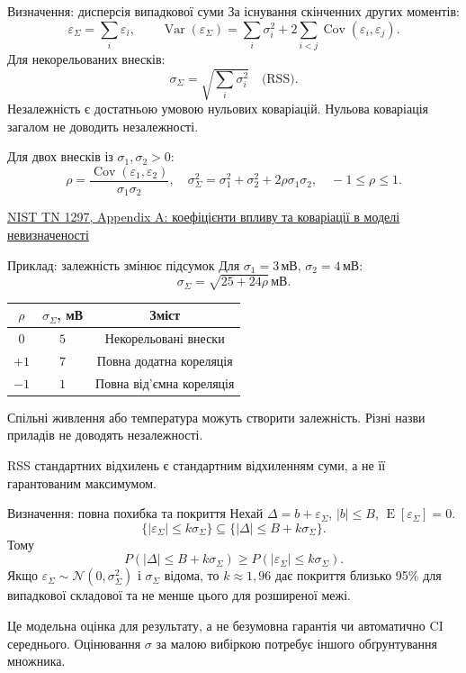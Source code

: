 \documentclass[aspectratio=169,11pt]{beamer}
\newcommand{\unit}[1]{\,\text{#1}}
\newcommand{\src}[2]{\par\vfill{\tiny\href{#1}{#2}}}
\newcommand{\E}{\operatorname{E}}
\newcommand{\Var}{\operatorname{Var}}
\newcommand{\Cov}{\operatorname{Cov}}
\begin{document}
\begin{frame}{Визначення: дисперсія випадкової суми}
За існування скінченних других моментів:
\[
\varepsilon_\Sigma=\sum_i\varepsilon_i,\qquad
\Var(\varepsilon_\Sigma)=\sum_i\sigma_i^2+2\sum_{i<j}\Cov(\varepsilon_i,\varepsilon_j).
\]
Для некорельованих внесків:
\[
\sigma_\Sigma=\sqrt{\sum_i\sigma_i^2}\quad\text{(RSS)}.
\]
Незалежність є достатньою умовою нульових коваріацій. Нульова коваріація загалом не доводить незалежності.
\medskip

Для двох внесків із $\sigma_1,\sigma_2>0$:
\[
\rho=\frac{\Cov(\varepsilon_1,\varepsilon_2)}{\sigma_1\sigma_2},\quad
\sigma_\Sigma^2=\sigma_1^2+\sigma_2^2+2\rho\sigma_1\sigma_2,\quad -1\le\rho\le1.
\]
\src{https://www.nist.gov/pml/nist-technical-note-1297/nist-tn-1297-appendix-law-propagation-uncertainty}{NIST TN 1297, Appendix A: коефіцієнти впливу та коваріації в моделі невизначеності}
\end{frame}

\begin{frame}{Приклад: залежність змінює підсумок}
Для $\sigma_1=3\unit{мВ}$, $\sigma_2=4\unit{мВ}$:
\[
\sigma_\Sigma=\sqrt{25+24\rho}\unit{мВ}.
\]
\begin{center}
\begin{tabular}{ccc}
\toprule
$\rho$ & $\sigma_\Sigma$, мВ & Зміст\\\midrule
$0$ & $5$ & Некорельовані внески\\
$+1$ & $7$ & Повна додатна кореляція\\
$-1$ & $1$ & Повна від’ємна кореляція\\\bottomrule
\end{tabular}
\end{center}
Спільні живлення або температура можуть створити залежність. Різні назви приладів не доводять незалежності.
\medskip

RSS стандартних відхилень є стандартним відхиленням суми, а не її гарантованим максимумом.
\end{frame}

\begin{frame}{Визначення: повна похибка та покриття}
Нехай $\Delta=b+\varepsilon_\Sigma$, $|b|\le B$, $\E[\varepsilon_\Sigma]=0$.
\[
\{|\varepsilon_\Sigma|\le k\sigma_\Sigma\}
\subseteq\{|\Delta|\le B+k\sigma_\Sigma\}.
\]
Тому
\[
P(|\Delta|\le B+k\sigma_\Sigma)\ge P(|\varepsilon_\Sigma|\le k\sigma_\Sigma).
\]
Якщо $\varepsilon_\Sigma\sim\mathcal N(0,\sigma_\Sigma^2)$ і $\sigma_\Sigma$ відома, то $k\approx1{,}96$ дає покриття близько 95\% для випадкової складової та не менше цього для розширеної межі.
\medskip

Це модельна оцінка для результату, а не безумовна гарантія чи автоматично CI середнього. Оцінювання $\sigma$ за малою вибіркою потребує іншого обґрунтування множника.
\end{frame}
\end{document}
